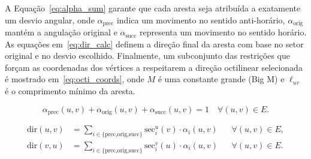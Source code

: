 \documentclass[cic,tc]{infufrgs}
\begin{document}
A Equação~\ref{eq:alpha_sum} garante que cada aresta seja atribuída a exatamente um desvio angular, onde $\alpha_{\text{prec}}$ indica um movimento no sentido anti-horário, $\alpha_{\text{orig}}$ mantém a angulação original e $\alpha_{\text{succ}}$ representa um movimento no sentido horário. As equações em~\ref{eq:dir_calc} definem a direção final da aresta com base no setor original e no desvio escolhido. Finalmente, um subconjunto das restrições que forçam as coordenadas dos vértices a respeitarem a direção octilinear selecionada é mostrado em~\ref{eq:octi_coords}, onde $M$ é uma constante grande (Big M) e $\ell_{uv}$ é o comprimento mínimo da aresta.

\begin{equation}
\alpha_{\text{prec}}(u, v) + \alpha_{\text{orig}}(u, v) + \alpha_{\text{succ}}(u, v) = 1 \quad \forall (u, v) \in E.
\label{eq:alpha_sum}
\end{equation}

\begin{align}
\text{dir}(u, v) &= \sum_{i \in \{\text{prec,orig,succ}\}} \text{sec}_i^u(v) \cdot \alpha_i(u, v) && \forall (u, v) \in E, \label{eq:dir_calc} \\
\text{dir}(v, u) &= \sum_{i \in \{\text{prec,orig,succ}\}} \text{sec}_i^v(u) \cdot \alpha_i(u, v) && \forall (u, v) \in E. \nonumber
\end{align}
\end{document}

